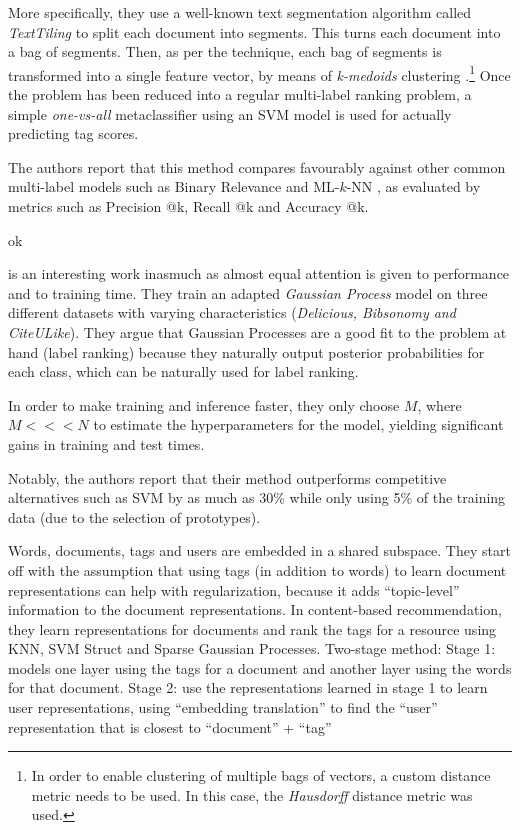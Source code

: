 More specifically, they use a well-known text segmentation algorithm called \textit{TextTiling} \citep{hearst_1994} to split each document into segments. This turns each document into a bag of segments. Then, as per the technique, each bag of segments is transformed into a single feature vector, by means of \textit{k-medoids} clustering \citep{kaufmanl_rousseeuw_1987}.\footnote{In order to enable clustering of multiple bags of vectors, a custom distance metric needs to be used. In this case, the  \textit{Hausdorff} distance metric \citep{huttenlocher_etal_1993} was used.} Once the problem has been reduced into a regular multi-label ranking problem, a simple \textit{one-vs-all} metaclassifier using an SVM model is used for actually predicting  tag scores.

The authors report that this method compares favourably against other common multi-label models such as Binary Relevance and ML-$k$-NN \citep{zhang_zhou_2007}, as evaluated by metrics such as Precision @k, Recall @k and Accuracy @k.

\cite{illig_etal_2011}

ok

\cite{song_etal_2011} is an interesting work inasmuch as almost equal attention is given to performance and to training time. They train an adapted \textit{Gaussian Process} model on three different datasets with varying characteristics (\textit{Delicious, Bibsonomy and CiteULike}). They argue that Gaussian Processes are a good fit to the problem at hand (label ranking) because they naturally output posterior probabilities for each class, which can be naturally used for label ranking.

In order to make training and inference faster, they only choose $M$, where $M <<< N$ to estimate the hyperparameters for the model, yielding significant gains in training and test times.

Notably, the authors report that their method outperforms competitive alternatives such as SVM by as much as 30\% while only using 5\% of the training data (due to the selection of prototypes).

\cite{kataria_agarwal_2015}
Words, documents, tags and users are embedded in a shared subspace.
They start off with the assumption that using tags (in addition to words) to learn document representations can help with regularization, because it adds “topic-level” information to the document representations.
In content-based recommendation, they learn representations for documents and rank the tags for a resource using KNN, SVM Struct and Sparse Gaussian Processes.
Two-stage method:
Stage 1: models one layer using the tags for a document and another layer using the words for that document.
Stage 2: use the representations learned in stage 1 to learn user representations, using “embedding translation” to find the “user” representation that is closest to “document” + “tag”

